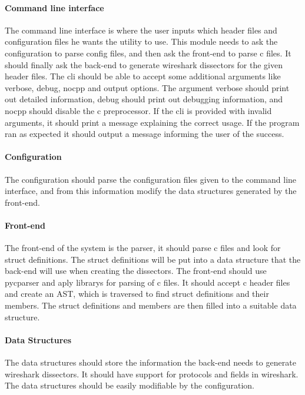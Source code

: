 \paragraph{Command line interface}
The command line interface is where the user inputs which \gls{header} files and
configuration files he wants the \gls{utility} to use. This module needs to ask
the configuration to parse config files, and then ask the front-end to parse \Gls{c}
files. It should finally ask the back-end to generate \Gls{wireshark} \glspl{dissector}
for the given \gls{header} files. The \gls{cli} should be able to accept some additional
arguments like verbose, debug, nocpp and output options.
The argument verbose should print out detailed information,
debug should print out debugging information, and nocpp should
disable the \Gls{c} \gls{preprocessor}. If the \gls{cli} is provided with invalid arguments, 
it should print a message explaining the correct usage.
If the program ran as expected it should output a message informing
the user of the success. 

\paragraph{Configuration}
The configuration should parse the configuration files given
to the command line interface, and from this information modify
the data structures generated by the front-end.

\paragraph{Front-end}
The front-end of the system is the \gls{parser}, it should parse \Gls{c} files and
look for \gls{struct} definitions. The \gls{struct} definitions will be put into a data structure
that the back-end will use when creating the \glspl{dissector}.
The front-end should use \gls{pycparser} and \gls{aply} \glspl{library} for parsing of \Gls{c} files. It should accept \Gls{c}
\gls{header} files and create an \gls{AST}, which is traversed
to find \gls{struct} definitions and their \glspl{member}. The \gls{struct} definitions and \glspl{member}
are then filled into a suitable data structure.

\paragraph{Data Structures}
The data structures should store the information the back-end needs to generate
\Gls{wireshark} \glspl{dissector}. It should have support for protocols and fields in \Gls{wireshark}.
The data structures should be easily modifiable by the configuration.

